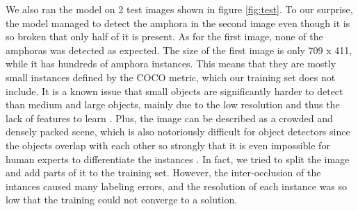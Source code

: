 \documentclass[a4paper, 11pt, oneside]{article}
\begin{document}
  We also ran the model on 2 test images shown in figure \ref{fig:test}. To our surprise, the model managed to detect
  the amphora in the second image even though it is so broken that only half of it is present. As for the first image,
  none of the amphoras was detected as expected. The size of the first image is only 709 x 411, while it has hundreds of
  amphora instances. This means that they are mostly small instances defined by the COCO metric, which our training set
  does not include. It is a known issue that small objects are significantly harder to detect than medium and
  large objects, mainly due to the low resolution and thus the lack of features to learn
  \cite{kisantal2019augmentation, li2017perceptual, eggert2017closer}.
  Plus, the image can be described as a crowded and densely packed scene, which is also notoriously difficult for object
  detectors since the objects overlap with each other so strongly that it is even impossible for human experts to
  differentiate the instances \cite{pasquet2017amphora, goldman2019precise, leibe2005pedestrian, arteta2013learning}.
  In fact, we tried to split the image and add parts of it to the training set. However, the inter-occlusion of the
  intances caused many labeling errors, and the resolution of each instance was so low that the training could not
  converge to a solution.
\end{document}
